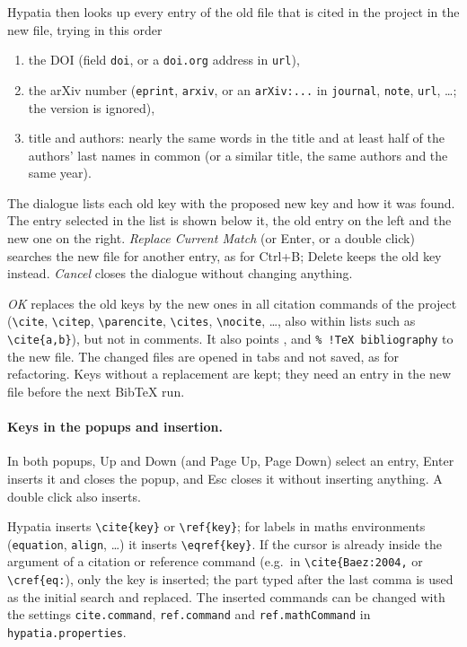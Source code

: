 \documentclass[11pt]{article}
\newcommand{\key}[1]{\textsf{#1}}
\newcommand{\file}[1]{\texttt{#1}}
\begin{document}
    Hypatia then looks up every entry of the old file that is cited in the project in the new file, trying in this order
    \begin{enumerate}
        \itemsep-1mm
        \item the DOI (field \verb+doi+, or a \verb+doi.org+ address in \verb+url+),
        \item the arXiv number (\verb+eprint+, \verb+arxiv+, or an \verb+arXiv:...+ in \verb+journal+, \verb+note+, \verb+url+, \ldots; the version is ignored),
        \item title and authors: nearly the same words in the title and at least half of the authors' last names in common (or a similar title, the same authors and the same year).
    \end{enumerate}
    The dialogue lists each old key with the proposed new key and how it was found. The entry selected in the list is shown below it, the old entry on the left and the new one on the right. \emph{Replace Current Match} (or \key{Enter}, or a double click) searches the new file for another entry, as for \key{Ctrl+B}; \key{Delete} keeps the old key instead. \emph{Cancel} closes the dialogue without changing anything.

    \emph{OK} replaces the old keys by the new ones in all citation commands of the project (\verb+\cite+, \verb+\citep+, \verb+\parencite+, \verb+\cites+, \verb+\nocite+, \ldots, also within lists such as \verb+\cite{a,b}+), but not in comments. It also points \verb++, \verb++ and \verb+% !TeX bibliography+ to the new file. The changed files are opened in tabs and not saved, as for refactoring. Keys without a replacement are kept; they need an entry in the new file before the next BibTeX run.

    \paragraph{Keys in the popups and insertion.}     In both popups, \key{Up} and \key{Down} (and \key{Page Up}, \key{Page Down}) select an entry, \key{Enter} inserts it and closes the popup, and \key{Esc} closes it without inserting anything. A double click also inserts.

    Hypatia inserts \verb+\cite{key}+ or \verb+\ref{key}+; for labels in maths environments (\verb+equation+, \verb+align+, \ldots) it inserts \verb+\eqref{key}+. If the cursor is already inside the argument of a citation or reference command (e.g.\ in \verb+\cite{Baez:2004,+ or \verb+\cref{eq:+), only the key is inserted; the part typed after the last comma is used as the initial search and replaced. The inserted commands can be changed with the settings \verb+cite.command+, \verb+ref.command+ and \verb+ref.mathCommand+ in \file{hypatia.properties}.
\end{document}
